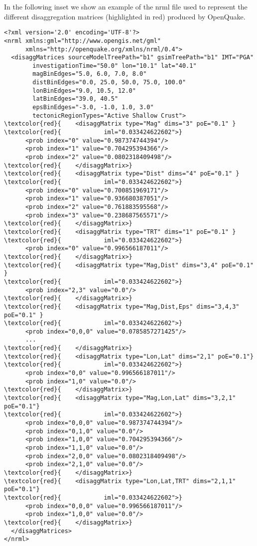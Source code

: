 In the following inset we show an example of the nrml file 
used to represent the different disaggregation matrices (highlighted 
in red) produced by OpenQuake.
%
\begin{Verbatim}[frame=single, commandchars=\\\{\}, fontsize=\small]
<?xml version='2.0' encoding='UTF-8'?>
<nrml xmlns:gml="http://www.opengis.net/gml" 
      xmlns="http://openquake.org/xmlns/nrml/0.4">
  <disaggMatrices sourceModelTreePath="b1" gsimTreePath="b1" IMT="PGA" 
        investigationTime="50.0" lon="10.1" lat="40.1" 
        magBinEdges="5.0, 6.0, 7.0, 8.0" 
        distBinEdges="0.0, 25.0, 50.0, 75.0, 100.0" 
        lonBinEdges="9.0, 10.5, 12.0" 
        latBinEdges="39.0, 40.5" 
        epsBinEdges="-3.0, -1.0, 1.0, 3.0" 
        tectonicRegionTypes="Active Shallow Crust">
\textcolor{red}{    <disaggMatrix type="Mag" dims="3" poE="0.1" }
\textcolor{red}{            iml="0.033424622602">}
      <prob index="0" value="0.987374744394"/>
      <prob index="1" value="0.704295394366"/>
      <prob index="2" value="0.0802318409498"/>
\textcolor{red}{    </disaggMatrix>}
\textcolor{red}{    <disaggMatrix type="Dist" dims="4" poE="0.1" }
\textcolor{red}{            iml="0.033424622602">}
      <prob index="0" value="0.700851969171"/>
      <prob index="1" value="0.936680387051"/>
      <prob index="2" value="0.761883595568"/>
      <prob index="3" value="0.238687565571"/>
\textcolor{red}{    </disaggMatrix>}
\textcolor{red}{    <disaggMatrix type="TRT" dims="1" poE="0.1" }
\textcolor{red}{            iml="0.033424622602">}
      <prob index="0" value="0.996566187011"/>
\textcolor{red}{    </disaggMatrix>}
\textcolor{red}{    <disaggMatrix type="Mag,Dist" dims="3,4" poE="0.1" }
\textcolor{red}{            iml="0.033424622602">}
      <prob index="2,3" value="0.0"/>
\textcolor{red}{    </disaggMatrix>}
\textcolor{red}{    <disaggMatrix type="Mag,Dist,Eps" dims="3,4,3" poE="0.1" }
\textcolor{red}{            iml="0.033424622602">}
      <prob index="0,0,0" value="0.0785857271425"/>
      ...
\textcolor{red}{    </disaggMatrix>}
\textcolor{red}{    <disaggMatrix type="Lon,Lat" dims="2,1" poE="0.1"}
\textcolor{red}{            iml="0.033424622602">}
      <prob index="0,0" value="0.996566187011"/>
      <prob index="1,0" value="0.0"/>
\textcolor{red}{    </disaggMatrix>}
\textcolor{red}{    <disaggMatrix type="Mag,Lon,Lat" dims="3,2,1" poE="0.1"} 
\textcolor{red}{            iml="0.033424622602">}
      <prob index="0,0,0" value="0.987374744394"/>
      <prob index="0,1,0" value="0.0"/>
      <prob index="1,0,0" value="0.704295394366"/>
      <prob index="1,1,0" value="0.0"/>
      <prob index="2,0,0" value="0.0802318409498"/>
      <prob index="2,1,0" value="0.0"/>
\textcolor{red}{    </disaggMatrix>}
\textcolor{red}{    <disaggMatrix type="Lon,Lat,TRT" dims="2,1,1" poE="0.1"} 
\textcolor{red}{            iml="0.033424622602">}
      <prob index="0,0,0" value="0.996566187011"/>
      <prob index="1,0,0" value="0.0"/>
\textcolor{red}{    </disaggMatrix>}
  </disaggMatrices>
</nrml>

\end{Verbatim}

